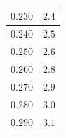 \documentclass[letterpaper, 12pt]{article}
\begin{document}
\begin{longtable}{|c|c|}
    \hline
    $0.230$                                                                                                                                                                     & $2.4$                                                                                                                                                                                  \\
    \hline
    $0.240$                                                                                                                                                                     & $2.5$                                                                                                                                                                                  \\
    \hline
    $0.250$                                                                                                                                                                     & $2.6$                                                                                                                                                                                  \\
    \hline
    $0.260$                                                                                                                                                                     & $2.8$                                                                                                                                                                                  \\
    \hline
    $0.270$                                                                                                                                                                     & $2.9$                                                                                                                                                                                  \\
    \hline
    $0.280$                                                                                                                                                                     & $3.0$                                                                                                                                                                                  \\
    \hline
    $0.290$                                                                                                                                                                     & $3.1$                                                                                                                                                                                  \\

\end{longtable}
\end{document}
